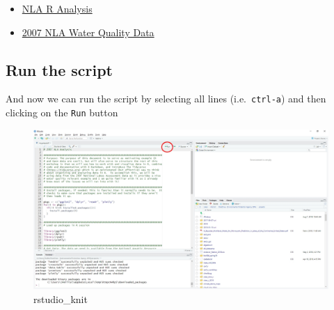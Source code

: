 \documentclass[]{article}
\providecommand{\tightlist}{%
  \setlength{\itemsep}{0pt}\setlength{\parskip}{0pt}}
\begin{document}
\begin{itemize}
\tightlist
\item
  \href{https://raw.githubusercontent.com/usepa/intro_r_workshop/master/lessons/nla_analysis.R}{NLA
  R Analysis}
\item
  \href{https://www.epa.gov/sites/production/files/2014-10/nla2007_chemical_conditionestimates_20091123.csv}{2007
  NLA Water Quality Data}
\end{itemize}

\hypertarget{run-the-script}{%
\subsection{Run the script}\label{run-the-script}}

And now we can run the script by selecting all lines
(i.e.~\texttt{ctrl-a}) and then clicking on the \texttt{Run} button

\begin{figure}
\centering
\includegraphics{figures/rstudio_run.jpg}
\caption{rstudio\_knit}
\end{figure}
\end{document}
